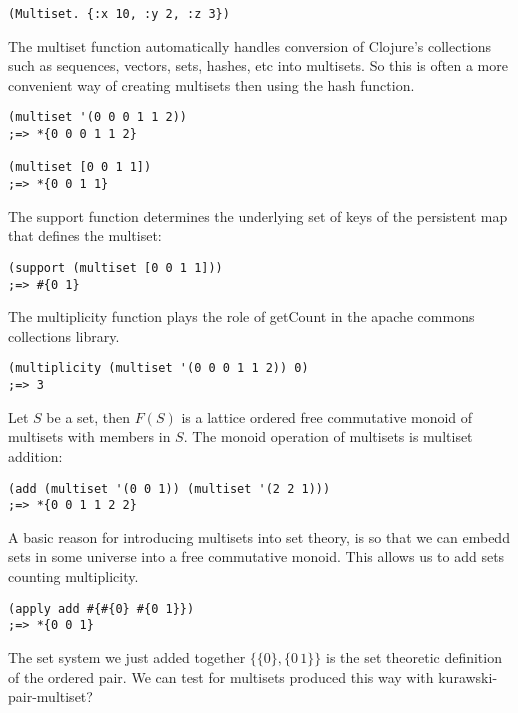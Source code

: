 \documentclass[a4paper,11pt]{report}
\begin{document}
\lstset {language=Lisp}
\begin{lstlisting}
(Multiset. {:x 10, :y 2, :z 3})
\end{lstlisting}

The multiset function automatically handles conversion of Clojure's collections such as sequences, vectors, sets, hashes, etc into multisets. So this is often a more convenient way of creating multisets then using the hash function.

\lstset {language=Lisp}
\begin{lstlisting}
(multiset '(0 0 0 1 1 2))
;=> *{0 0 0 1 1 2}

(multiset [0 0 1 1])
;=> *{0 0 1 1}
\end{lstlisting}

The support function determines the underlying set of keys of the persistent map that defines the multiset:

\lstset {language=Lisp}
\begin{lstlisting}
(support (multiset [0 0 1 1]))
;=> #{0 1}
\end{lstlisting}

The multiplicity function plays the role of getCount in the apache commons collections library.

\lstset {language=Lisp}
\begin{lstlisting}
(multiplicity (multiset '(0 0 0 1 1 2)) 0)
;=> 3
\end{lstlisting}

Let $S$ be a set, then $F(S)$ is a lattice ordered free commutative monoid of multisets with members in $S$. The monoid operation of multisets is multiset addition:

\lstset {language=Lisp}
\begin{lstlisting}
(add (multiset '(0 0 1)) (multiset '(2 2 1)))
;=> *{0 0 1 1 2 2}
\end{lstlisting}

A basic reason for introducing multisets into set theory, is so that we can embedd sets in some universe into a free commutative monoid. This allows us to add sets counting multiplicity.

\lstset {language=Lisp}
\begin{lstlisting}
(apply add #{#{0} #{0 1}})
;=> *{0 0 1}
\end{lstlisting}

The set system we just added together $\{\{0\}, \{0 \, 1\}\}$ is the set theoretic definition of the ordered pair. We can test for multisets produced this way with kurawski-pair-multiset?
\end{document}
